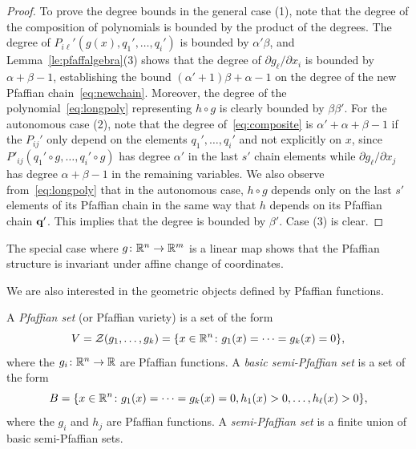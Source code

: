 \begin{proof}
To prove the degree bounds in the general case (1), note that the degree of the composition of polynomials is bounded by the product of the degrees. The degree of $P_{i\ell}'(g(x),q_1',\dots,q_i')$ is bounded by $\alpha'\beta$, and Lemma~\ref{le:pfaffalgebra}(3) shows that the degree of $\partial g_{\ell}/\partial x_i$ is bounded by $\alpha+\beta-1$, establishing the bound $(\alpha'+1)\beta+\alpha-1$ on the degree of the new Pfaffian chain~\eqref{eq:newchain}. 
Moreover, the degree of the polynomial~\eqref{eq:longpoly} representing $h\circ g$ is clearly bounded by $\beta\beta'$. 
For the autonomous case (2), note that the degree of~\eqref{eq:composite} is $\alpha'+\alpha+\beta-1$ if the $P_{ij}'$ only depend on the elements $q_1',\dots,q_i'$ and not explicitly on $x$, since $P'_{ij}(q_1'\circ g,\dots,q_i'\circ g)$ has degree $\alpha'$ in the last $s'$ chain elements while $\partial g_\ell/\partial x_j$ has degree $\alpha+\beta-1$ in the remaining variables. We also observe from~\eqref{eq:longpoly} that in the autonomous case, $h\circ g$ depends only on the last $s'$ elements of its Pfaffian chain in the same way that $h$ depends on its Pfaffian chain $\mathbf{q}'$. This implies that the degree is bounded by $\beta'$.
Case (3) is clear.
\end{proof}

\begin{remark}\label{re:affine}
The special case where $g\colon \mathbb{R}^n\to \mathbb{R}^m$ is a linear map shows that the Pfaffian structure is invariant under affine change of coordinates.
\end{remark}

We are also interested in the geometric objects defined by Pfaffian functions.

\begin{definition}
A \emph{Pfaffian set} (or Pfaffian variety) is a set of the form 
\begin{equation*}
  V = \mathcal{Z}(g_1, \dotsc, g_k) = \{x\in \mathbb{R}^n\colon g_1(x)=\cdots = g_k(x)=0\},
\end{equation*}  
where the $g_i\colon \mathbb{R}^n\to \mathbb{R}$ are Pfaffian functions. A {\em basic semi-Pfaffian set} is a set of the form
\begin{equation*}
 B = \{x\in \mathbb{R}^n \colon g_1(x)=\cdots = g_k(x)=0, h_1(x)>0,\dots,h_{\ell}(x)>0\},
\end{equation*}
where the $g_i$ and $h_j$ are Pfaffian functions. A {\em semi-Pfaffian set} is a finite union of basic semi-Pfaffian sets.
\end{definition}

